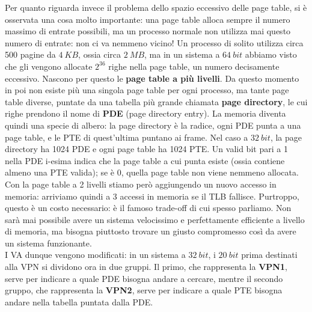 \documentclass[11pt, a4paper, titlepage, oneside]{scrbook}
\begin{document}
Per quanto riguarda invece il problema dello spazio eccessivo delle page table, si è osservata una cosa molto importante: una page table alloca sempre il numero massimo di entrate possibili, ma un processo normale non utilizza mai questo numero di entrate: non ci va nemmeno vicino! Un processo di solito utilizza circa 500 pagine da $\SI{4}{KB}$, ossia circa $\SI{2}{MB}$, ma in un sistema a $\SI{64}{bit}$ abbiamo visto che gli vengono allocate $2^{36}$ righe nella page table, un numero decisamente eccessivo. Nascono per questo le \textbf{page table a più livelli}. Da questo momento in poi non esiste più una singola page table per ogni processo, ma tante page table diverse, puntate da una tabella più grande chiamata \textbf{page directory}, le cui righe prendono il nome di \textbf{PDE} (page directory entry). La memoria diventa quindi una specie di albero: la page directory è la radice, ogni PDE punta a una page table, e le PTE di quest'ultima puntano ai frame. Nel caso a $\SI{32}{bit}$, la page directory ha 1024 PDE e ogni page table ha 1024 PTE. Un valid bit pari a 1 nella PDE i-esima indica che la page table a cui punta esiste (ossia contiene almeno una PTE valida); se è 0, quella page table non viene nemmeno allocata. \\
Con la page table a 2 livelli stiamo però aggiungendo un nuovo accesso in memoria: arriviamo quindi a 3 accessi in memoria se il TLB fallisce. Purtroppo, questo è un costo necessario: è il famoso trade-off di cui spesso parliamo. Non sarà mai possibile avere un sistema velocissimo e perfettamente efficiente a livello di memoria, ma bisogna piuttosto trovare un giusto compromesso così da avere un sistema funzionante. \\

I VA dunque vengono modificati: in un sistema a $\SI{32}{bit}$, i $\SI{20}{bit}$ prima destinati alla VPN si dividono ora in due gruppi. Il primo, che rappresenta la \textbf{VPN1}, serve per indicare a quale PDE bisogna andare a cercare, mentre il secondo gruppo, che rappresenta la \textbf{VPN2}, serve per indicare a quale PTE bisogna andare nella tabella puntata dalla PDE. 
\end{document}
